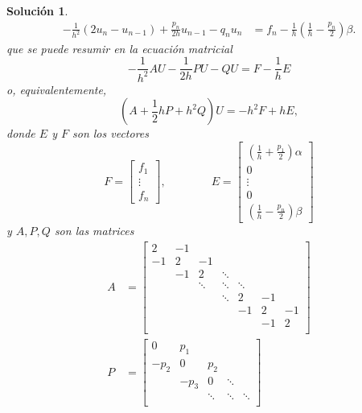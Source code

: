 \documentclass[11pt]{article}
\newtheorem*{sol}{Solución}
\begin{document}
\begin{sol}
\begin{align}
      - \frac{1}{h^{2}}(2u_{n}-u_{n-1})
      + \frac{p_n}{2h}u_{n-1}
      - q_n u_n
      &=
      f_n - \frac{1}{h}\left(\frac{1}{h} - \frac{p_n}{2}\right)\beta.
  \end{align}
  que se puede resumir en la ecuación matricial
  \begin{equation}
    -\frac{1}{h^{2}}AU - \frac{1}{2h}PU - QU = F - \frac{1}{h}E
  \end{equation}
  o, equivalentemente,
  \begin{equation}\label{eq:metodo_matr}
    \left(A + \frac{1}{2}hP + h^{2}Q\right)U = -h^{2}F + hE
  ,\end{equation}
  donde $E$ y $F$ son los vectores
  \begin{equation}
      F =
      \begin{bmatrix}
        f_1 \\ \vdots \\ f_n
      \end{bmatrix},
      \qquad\qquad
      E =
      \begin{bmatrix}
        \left(\frac{1}{h} + \frac{p_1}{2}\right)\alpha
        \\
        0 \\
        \vdots \\
        0 \\
        \left(\frac{1}{h} - \frac{p_n}{2}\right)\beta
      \end{bmatrix}
  \end{equation}
  y $A,P,Q$ son las matrices
  \begin{align}
      A
      &=
      \begin{bmatrix}
        2 & -1 \\
        -1 & 2 & -1 \\[-2mm]
           & -1 & 2 & \ddots \\
           & & \ddots & \ddots & \ddots \\
           &  & & \ddots & 2 & -1 \\
           &&&& -1 & 2 & -1 \\
           &&&& & -1 & 2 \\
      \end{bmatrix}
    \\
      P
      &=
      \begin{bmatrix}
        0 & p_1 \\
        -p_2 & 0 & p_2 \\[-2mm]
           & -p_3 & 0 & \ddots \\
           & & \ddots & \ddots & \ddots \\

\end{bmatrix}
\end{align}
\end{sol}
\end{document}
